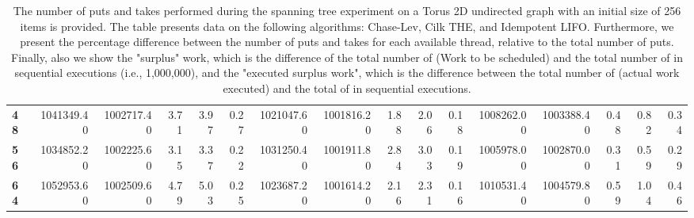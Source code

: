 \begin{table}[!ht]
{\begin{tabular}{lrrrrrrrrrrrrrrr}
\textbf{48} & 1041349.40 & 1002717.40 &           3.71 &        3.97 &                 0.27 & 1021047.60 & 1001816.20 &           1.88 &        2.06 &                 0.18 &      1008262.00 & 1003388.40 &           0.48 &        0.82 &                 0.34 \\
\textbf{56} & 1034852.20 & 1002225.60 &           3.15 &        3.37 &                 0.22 & 1031250.40 & 1001911.80 &           2.84 &        3.03 &                 0.19 &      1005978.00 & 1002870.00 &           0.31 &        0.59 &                 0.29 \\
\textbf{64} & 1052953.60 & 1002509.60 &           4.79 &        5.03 &                 0.25 & 1023687.20 & 1001614.20 &           2.16 &        2.31 &                 0.16 &      1010531.40 & 1004579.80 &           0.59 &        1.04 &                 0.46 \\
\bottomrule
\end{tabular}}
\label{difference-Torus_2D_undirected-256-CHASELEV-CILK-IDEMPOTENT_LIFO}
\caption{The number of puts and takes performed during the
    spanning tree experiment on a Torus 2D undirected graph with an initial size
    of 256 items is provided. The table presents data on the
    following algorithms: Chase-Lev, Cilk THE, and
    Idempotent LIFO. Furthermore, we present the percentage difference
    between the number of puts and takes for each available thread,
    relative to the total number of puts. Finally, also we show the
    "surplus" work, which is the difference of the total number of
    \Puts (Work to be scheduled) and the total number of \Puts in
    sequential executions (i.e., 1,000,000), and the "executed surplus
    work", which is the difference between the total number of \Takes
    (actual work executed) and the total of \Takes in sequential
    executions.}
\end{table}
